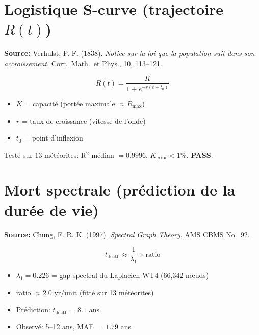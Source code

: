 \documentclass[11pt,a4paper]{article}
\begin{document}
\section{Logistique S-curve (trajectoire $R(t)$)}

\textbf{Source:} Verhulst, P. F. (1838).
\textit{Notice sur la loi que la population suit dans son accroissement}.
Corr.\ Math.\ et Phys., 10, 113--121.

\begin{equation}
\boxed{R(t) = \frac{K}{1 + e^{-r(t - t_0)}}}
\end{equation}
\begin{itemize}
\item $K$ = capacit\'e (port\'ee maximale $\approx R_{\max}$)
\item $r$ = taux de croissance (vitesse de l'onde)
\item $t_0$ = point d'inflexion
\end{itemize}

Test\'e sur 13 m\'et\'eorites: R$^2$ m\'edian $= 0.9996$, $K_{\text{error}} < 1\%$.
\textbf{PASS}.

\section{Mort spectrale (pr\'ediction de la dur\'ee de vie)}

\textbf{Source:} Chung, F. R. K. (1997).
\textit{Spectral Graph Theory}. AMS CBMS No.\ 92.

\begin{equation}
\boxed{t_{\text{death}} \approx \frac{1}{\lambda_1} \times \text{ratio}}
\end{equation}
\begin{itemize}
\item $\lambda_1 = 0.226$ = gap spectral du Laplacien WT4 (66,342 n\oe uds)
\item ratio $\approx 2.0$ yr/unit (fitt\'e sur 13 m\'et\'eorites)
\item Pr\'ediction: $t_{\text{death}} = 8.1$ ans
\item Observ\'e: 5--12 ans, MAE $= 1.79$ ans
\end{itemize}
\end{document}
